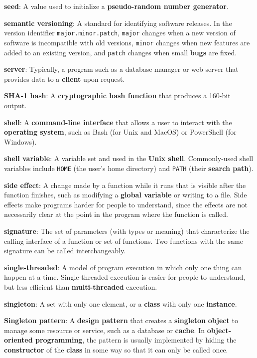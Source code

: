 \documentclass[krantzl]{krantz}
\newcommand{\glosskey}[1]{\textbf{#1}}
\begin{document}
\noindent \textbf{\glosskey{seed}}: 
A value used to initialize a \glosskey{pseudo-random number generator}.


\noindent \textbf{\glosskey{semantic versioning}}: 
A standard for identifying software releases. In the version identifier \texttt{major.minor.patch}, \texttt{major} changes when a new version of software is incompatible with old versions, \texttt{minor} changes when new features are added to an existing version, and \texttt{patch} changes when small \glosskey{bugs} are fixed.


\noindent \textbf{\glosskey{server}}: 
Typically, a program such as a database manager or web server that provides data to a \glosskey{client} upon request.


\noindent \textbf{\glosskey{SHA-1 hash}}: 
A \glosskey{cryptographic hash function} that produces a 160-bit output.


\noindent \textbf{\glosskey{shell}}: 
A \glosskey{command-line interface} that allows a user to interact with the \glosskey{operating system}, such as Bash (for Unix and MacOS) or PowerShell (for Windows).


\noindent \textbf{\glosskey{shell variable}}: 
A variable set and used in the \glosskey{Unix shell}. Commonly-used shell variables include \texttt{HOME} (the user's home directory) and \texttt{PATH} (their \glosskey{search path}).


\noindent \textbf{\glosskey{side effect}}: 
A change made by a function while it runs that is visible after the function finishes, such as modifying a \glosskey{global variable} or writing to a file. Side effects make programs harder for people to understand, since the effects are not necessarily clear at the point in the program where the function is called.


\noindent \textbf{\glosskey{signature}}: 
The set of parameters (with types or meaning) that characterize the calling interface of a function or set of functions. Two functions with the same signature can be called interchangeably.


\noindent \textbf{\glosskey{single-threaded}}: 
A model of program execution in which only one thing can happen at a time. Single-threaded execution is easier for people to understand, but less efficient than \glosskey{multi-threaded} execution.


\noindent \textbf{\glosskey{singleton}}: 
A set with only one element, or a \glosskey{class} with only one \glosskey{instance}.


\noindent \textbf{\glosskey{Singleton pattern}}: 
A \glosskey{design pattern} that creates a \glosskey{singleton} \glosskey{object} to manage some resource or service, such as a database or \glosskey{cache}. In \glosskey{object-oriented programming}, the pattern is usually implemented by hiding the \glosskey{constructor} of the \glosskey{class} in some way so that it can only be called once.
\end{document}
